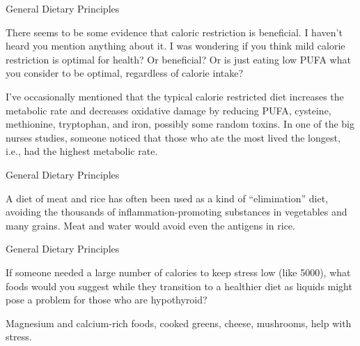 \documentclass[11pt,oneside,openany,extrafontsizes]{memoir}
\begin{document}
\begin{qaexchange}{General Dietary Principles}

    \begin{question}
        There seems to be some evidence that caloric restriction is beneficial. I haven't heard you mention anything about it. I was wondering if you think mild calorie restriction is optimal for health? Or beneficial? Or is just eating low PUFA what you consider to be optimal, regardless of calorie intake?
    \end{question}

    \begin{answer}
      I've occasionally mentioned that the typical calorie restricted diet increases the metabolic rate and decreases oxidative damage by reducing PUFA, cysteine, methionine, tryptophan, and iron, possibly some random toxins. In one of the big nurses studies, someone noticed that those who ate the most lived the longest, i.e., had the highest metabolic rate.
    \end{answer}
\end{qaexchange}

\begin{standalonequote}{General Dietary Principles}

    \begin{answer}
      A diet of meat and rice has often been used as a kind of \enquote{elimination} diet, avoiding the thousands of inflammation-promoting substances in vegetables and many grains. Meat and water would avoid even the antigens in rice.
    \end{answer}
\end{standalonequote}

\begin{qaexchange}{General Dietary Principles}

    \begin{question}
        If someone needed a large number of calories to keep stress low (like 5000), what foods would you suggest while they transition to a healthier diet as liquids might pose a problem for those who are hypothyroid? 
    \end{question}

    \begin{answer}
      Magnesium and calcium-rich foods, cooked greens, cheese, mushrooms, help with stress.
    \end{answer}
\end{qaexchange}
\end{document}
